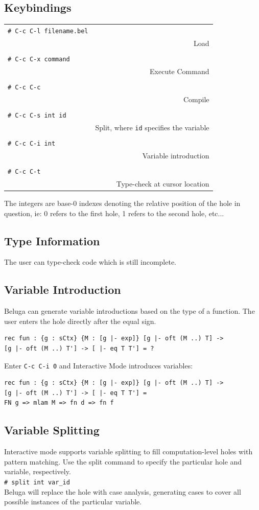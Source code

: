 \documentclass[11pt]{article}
\newcommand{\shellcmd}[1]{\\\indent\texttt{\# #1}\\}
\begin{document}
\subsection{Keybindings}

\begin{tabular}{ l r }
\shellcmd{C-c C-l filename.bel} & Load \\
\shellcmd{C-c C-x command} & Execute Command \\
\shellcmd{C-c C-c} & Compile \\
\shellcmd{C-c C-s int id} & Split, where \texttt{id} specifies the variable \\
\shellcmd{C-c C-i int} & Variable introduction \\
\shellcmd{C-c C-t} & Type-check at cursor location \\
\end{tabular}

The integers are base-0 indexes denoting the relative position of the hole in question, ie: 0 refers to the first hole, 1 refers to the second hole, etc... 
\subsection{Type Information}
The user can type-check code which is still incomplete. 

\subsection{Variable Introduction}
Beluga can generate variable introductions based on the type of a function. The user enters the hole directly after the equal sign. 
\begin{verbatim}
rec fun : {g : sCtx} {M : [g |- exp]} [g |- oft (M ..) T] -> 
[g |- oft (M ..) T'] -> [ |- eq T T'] = ?
\end{verbatim}

Enter \texttt{C-c C-i 0} and Interactive Mode introduces variables:
\begin{verbatim}
rec fun : {g : sCtx} {M : [g |- exp]} [g |- oft (M ..) T] -> 
[g |- oft (M ..) T'] -> [ |- eq T T'] =
FN g => mlam M => fn d => fn f
\end{verbatim}


\subsection{Variable Splitting}
Interactive mode supports variable splitting to fill computation-level holes with pattern matching. Use the split command to specify the particular hole and variable, respectively.
\shellcmd{split int var\_id}
 Beluga will replace the hole with case analysis, generating cases to cover all possible instances of the particular variable. 
\end{document}
